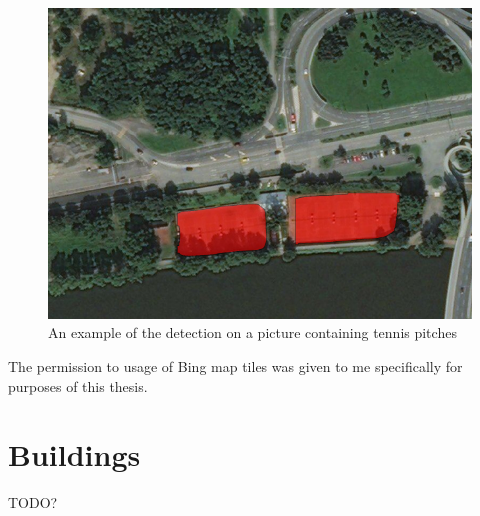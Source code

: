\begin{figure}[H]
   \centering
	\includegraphics[width=.8\linewidth]{./pictures/out2.png}
	\caption[Detection of tennis pitches]{An example of the detection on a picture containing tennis pitches}
      \label{fig:tennis}
\end{figure}

The permission to usage of Bing map tiles was given to me specifically for purposes of this thesis.

\section{Buildings}

TODO?
